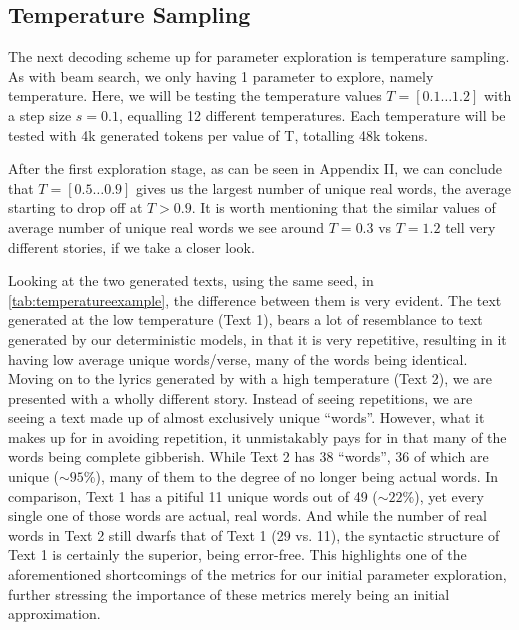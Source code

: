 \subsection{Temperature Sampling}
\label{sec:tuningtemp}

The next decoding scheme up for parameter exploration is temperature sampling. As with beam search, we only having 1 parameter to explore, namely temperature. Here, we will be testing the temperature values $T=[0.1 \ldots 1.2]$ with a step size $s=0.1$, equalling 12 different temperatures. Each temperature will be tested with 4k generated tokens per value of T, totalling 48k tokens.

After the first exploration stage, as can be seen in Appendix II, we can conclude that $T=[0.5 \ldots 0.9]$ gives us the largest number of unique real words, the average starting to drop off at $T>0.9$. It is worth mentioning that the similar values of average number of unique real words we see around $T=0.3$ vs $T=1.2$ tell very different stories, if we take a closer look.

Looking at the two generated texts, using the same seed, in \cref{tab:temperatureexample}, the difference between them is very evident. The text generated at the low temperature (Text 1), bears a lot of resemblance to text generated by our deterministic models, in that it is very repetitive, resulting in it having low average unique words/verse, many of the words being identical. Moving on to the lyrics generated by with a high temperature (Text 2), we are presented with a wholly different story. Instead of seeing repetitions, we are seeing a text made up of almost exclusively unique “words”. However, what it makes up for in avoiding repetition, it unmistakably pays for in that many of the words being complete gibberish. While Text 2 has 38 “words”, 36 of which are unique ($\sim95\%$), many of them to the degree of no longer being actual words. In comparison, Text 1 has a pitiful 11 unique words out of 49 ($\sim22\%$), yet every single one of those words are actual, real words. And while the number of real words in Text 2 still dwarfs that of Text 1 (29 vs. 11), the syntactic structure of Text 1 is certainly the superior, being error-free. This highlights one of the aforementioned shortcomings of the metrics for our initial parameter exploration, further stressing the importance of these metrics merely being an initial approximation.

